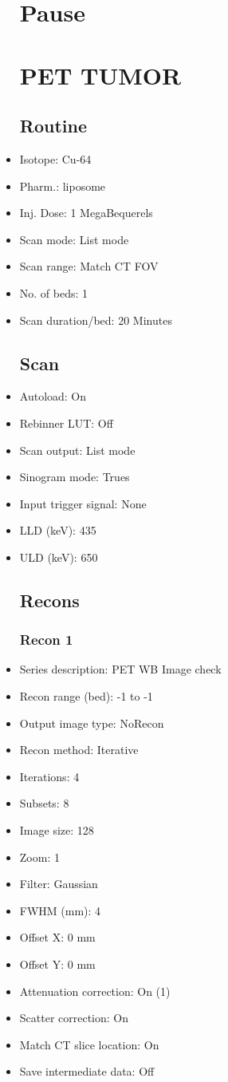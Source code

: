 \documentclass[12pt]{article}
\begin{document}
\begin{itemize}
\section{Pause}
\section{PET TUMOR}\subsection{Routine}
\item Isotope: Cu-64
\item Pharm.: liposome
\item Inj. Dose: 1 MegaBequerels
\item Scan mode: List mode
\item Scan range: Match CT FOV
\item No. of beds: 1
\item Scan duration/bed: 20 Minutes
\subsection{Scan}
\item Autoload: On
\item Rebinner LUT: Off
\item Scan output: List mode
\item Sinogram mode: Trues
\item Input trigger signal: None
\item LLD (keV): 435
\item ULD (keV): 650
\subsection{Recons}
\subsubsection{Recon 1}
\item Series description: PET WB Image check
\item Recon range (bed): -1 to -1
\item Output image type: NoRecon
\item Recon method: Iterative
\item Iterations: 4
\item Subsets: 8
\item Image size: 128
\item Zoom: 1
\item Filter: Gaussian
\item FWHM (mm): 4
\item Offset X: 0 mm
\item Offset Y: 0 mm
\item Attenuation correction: On (1)
\item Scatter correction: On
\item Match CT slice location: On
\item Save intermediate data: Off
\end{itemize}
\end{document}

